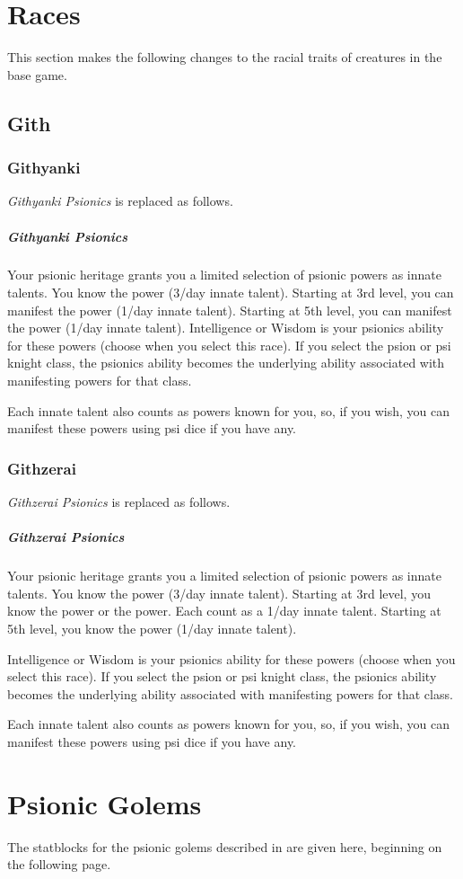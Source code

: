 \section{Races}
\label{sec:races}
This section makes the following changes to the racial traits
of creatures in the base game.

\subsection{Gith}
\subsubsection{Githyanki}
\emph{Githyanki Psionics} is replaced as follows.
\subparagraph{Githyanki Psionics}
    Your psionic heritage grants you a limited selection of
    psionic powers as innate talents.    
    You know the  power (3/day innate talent).
    Starting at 3rd level,
    you can manifest the  power (1/day innate talent).
    Starting at 5th level,
    you can manifest the  power (1/day innate talent).
    Intelligence or Wisdom is your psionics ability for these powers
    (choose when you select this race).
    If you select the psion or psi knight class,
    the psionics ability becomes the underlying ability
    associated with manifesting powers for that class.

    Each innate talent also counts as powers known for you,
    so, if you wish,
    you can manifest these powers using psi dice if you have any.

\subsubsection{Githzerai}
\emph{Githzerai Psionics} is replaced as follows.
\subparagraph{Githzerai Psionics}
    Your psionic heritage grants you a limited selection of
    psionic powers as innate talents.    
    You know the  power (3/day innate talent).
    Starting at 3rd level,
    you know the  power or the
     power.
    Each count as a 1/day innate talent.
    Starting at 5th level,
    you know the  power (1/day innate talent).

    Intelligence or Wisdom is your psionics ability for these powers
    (choose when you select this race).
    If you select the psion or psi knight class,
    the psionics ability becomes the underlying ability
    associated with manifesting powers for that class.

    Each innate talent also counts as powers known for you,
    so, if you wish,
    you can manifest these powers using psi dice if you have any.

\section{Psionic Golems}
\label{sec:psionic_golem}
The statblocks for the psionic golems described in
are given here, beginning on the following page.

\clearpage

